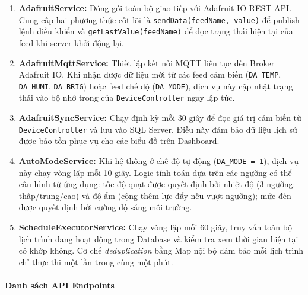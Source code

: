 \begin{enumerate}
    \item \textbf{AdafruitService:} Đóng gói toàn bộ giao tiếp với Adafruit IO REST API. Cung cấp hai phương thức cốt lõi là \texttt{sendData(feedName, value)} để publish lệnh điều khiển và \texttt{getLastValue(feedName)} để đọc trạng thái hiện tại của feed khi server khởi động lại.

    \item \textbf{AdafruitMqttService:} Thiết lập kết nối MQTT liên tục đến Broker Adafruit IO. Khi nhận được dữ liệu mới từ các feed cảm biến (\texttt{DA\_TEMP}, \texttt{DA\_HUMI}, \texttt{DA\_BRIG}) hoặc feed chế độ (\texttt{DA\_MODE}), dịch vụ này cập nhật trạng thái vào bộ nhớ trong của \texttt{DeviceController} ngay lập tức.

    \item \textbf{AdafruitSyncService:} Chạy định kỳ mỗi 30 giây để đọc giá trị cảm biến từ \texttt{DeviceController} và lưu vào SQL Server. Điều này đảm bảo dữ liệu lịch sử được bảo tồn phục vụ cho các biểu đồ trên Dashboard.

    \item \textbf{AutoModeService:} Khi hệ thống ở chế độ tự động (\texttt{DA\_MODE = 1}), dịch vụ này chạy vòng lặp mỗi 10 giây. Logic tính toán dựa trên các ngưỡng có thể cấu hình từ ứng dụng: tốc độ quạt được quyết định bởi nhiệt độ (3 ngưỡng: thấp/trung/cao) và độ ẩm (cộng thêm lực đẩy nếu vượt ngưỡng); mức đèn được quyết định bởi cường độ sáng môi trường.

    \item \textbf{ScheduleExecutorService:} Chạy vòng lặp mỗi 60 giây, truy vấn toàn bộ lịch trình đang hoạt động trong Database và kiểm tra xem thời gian hiện tại có khớp không. Cơ chế \textit{deduplication} bằng Map nội bộ đảm bảo mỗi lịch trình chỉ thực thi một lần trong cùng một phút.
\end{enumerate}

\paragraph{Danh sách API Endpoints}

